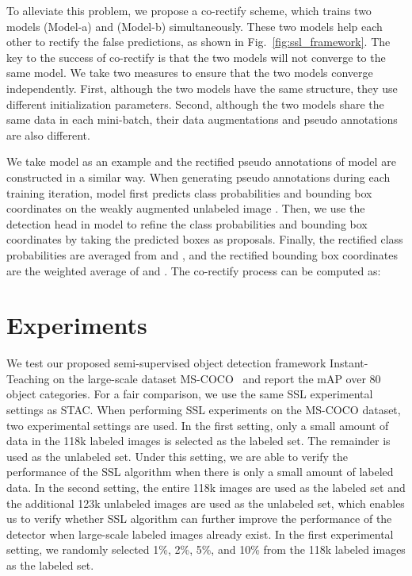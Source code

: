 \documentclass[final]{cvpr}
\begin{document}
To alleviate this problem, we propose a co-rectify scheme, which trains two models  (Model-a) and  (Model-b) simultaneously. These two models help each other to rectify the false predictions, as shown in Fig.~\ref{fig:ssl_framework}. The key to the success of co-rectify is that the two models will not converge to the same model. We take two measures to ensure that the two models converge independently. First, although the two models have the same structure, they use different initialization parameters. Second, although the two models share the same data in each mini-batch, their data augmentations and pseudo annotations are also different.

We take model  as an example and the rectified pseudo annotations of model  are constructed in a similar way. When generating pseudo annotations during each training iteration, model  first predicts class probabilities  and bounding box coordinates  on the weakly augmented unlabeled image .
Then, we use the detection head in model  to refine the class probabilities  and bounding box coordinates  by taking the predicted boxes  as proposals.
Finally, the rectified class probabilities  are averaged from  and ,  and the rectified bounding box coordinates  are the weighted average of  and . The co-rectify process can be computed as:





\section{Experiments}

We test our proposed semi-supervised object detection framework Instant-Teaching on the large-scale dataset MS-COCO~\cite{lin2014microsoft} and report the mAP over 80 object categories.
For a fair comparison, we use the same SSL experimental settings as STAC. When performing SSL experiments on the MS-COCO dataset, two experimental settings are used. In the first setting, only a small amount of data in the 118k labeled images is selected as the labeled set. The remainder is used as the unlabeled set. 
Under this setting, we are able to verify the performance of the SSL algorithm when there is only a small amount of labeled data. In the second setting, the entire 118k images are used as the labeled set and the additional 123k unlabeled images are used as the unlabeled set, which enables us to verify whether SSL algorithm can further improve the performance of the detector when large-scale labeled images already exist. In the first experimental setting, we randomly selected 1\%, 2\%, 5\%, and 10\% from the 118k labeled images as the labeled set.
\end{document}
